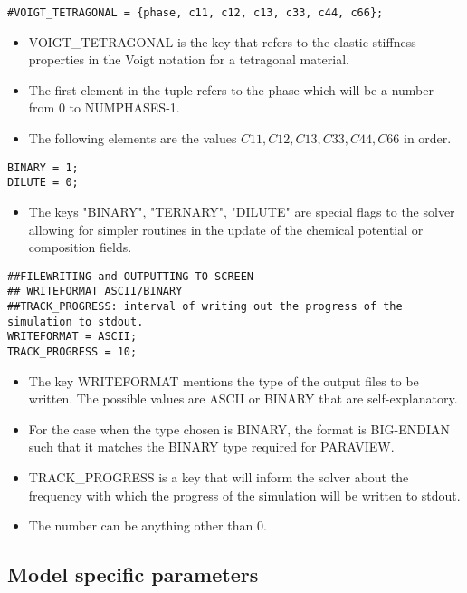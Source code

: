 \documentclass[a4paper,10pt]{article}
\begin{document}
\begin{lstlisting}
#VOIGT_TETRAGONAL = {phase, c11, c12, c13, c33, c44, c66};
\end{lstlisting}

\begin{itemize}
 \item VOIGT\_TETRAGONAL is the key that refers to the elastic stiffness properties in the Voigt notation for a tetragonal material. 
 \item The first element in the tuple refers to the phase which will be a number from 0 to NUMPHASES-1.
 \item The following elements are the values $C11,C12,C13,C33,C44,C66$ in order.
\end{itemize}

\begin{lstlisting}
BINARY = 1;
DILUTE = 0;
\end{lstlisting}

\begin{itemize}
 \item The keys "BINARY", "TERNARY", "DILUTE" are special flags to the solver allowing for simpler routines in the update of the chemical potential or composition fields.
\end{itemize}

\begin{lstlisting}
##FILEWRITING and OUTPUTTING TO SCREEN
## WRITEFORMAT ASCII/BINARY
##TRACK_PROGRESS: interval of writing out the progress of the simulation to stdout. 
WRITEFORMAT = ASCII;
TRACK_PROGRESS = 10;
\end{lstlisting}

\begin{itemize}
 \item The key WRITEFORMAT mentions the type of the output files to be written. The possible values are ASCII or BINARY that are self-explanatory.
 \item For the case when the type chosen is BINARY, the format is BIG-ENDIAN such that it matches the BINARY type required for PARAVIEW.
 \item TRACK\_PROGRESS is a key that will inform the solver about the frequency with which the progress of the simulation will be written to stdout.
 \item The number can be anything other than 0.
\end{itemize}



\subsection{Model specific parameters}
\end{document}
